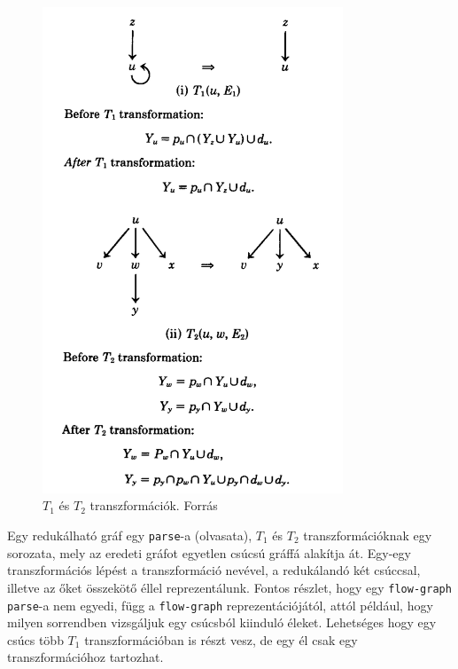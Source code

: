\documentclass[12pt,a4paper]{article}
\begin{document}
\begin{figure}
\caption{$T_1$ és $T_2$ transzformációk. Forrás \cite{article}}
\centering
\includegraphics[width=0.8\textwidth]{transforms.png}
\end{figure}

Egy redukálható gráf egy \texttt{parse}-a (olvasata), $T_1$ és $T_2$ transzformációknak egy sorozata, mely az eredeti gráfot egyetlen csúcsú gráffá alakítja át. Egy-egy transzformációs lépést a transzformáció nevével, a redukálandó két csúccsal, illetve az őket összekötő éllel reprezentálunk. Fontos részlet, hogy egy \texttt{flow-graph} \texttt{parse}-a nem egyedi, függ a \texttt{flow-graph} reprezentációjától, attól például, hogy milyen sorrendben vizsgáljuk egy csúcsból kiinduló éleket. Lehetséges hogy egy csúcs több $T_1$ transzformációban is részt vesz, de egy él csak egy transzformációhoz tartozhat.
\end{document}
